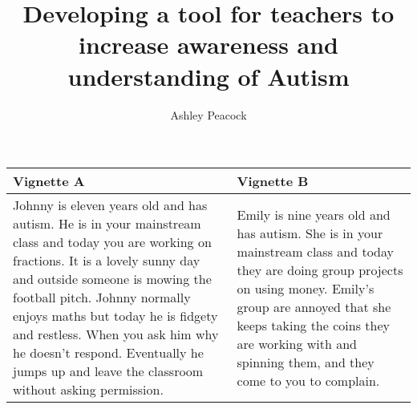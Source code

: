 \documentclass[11pt]{report}
\begin{document}
\title{Developing a tool for teachers to increase awareness and understanding of Autism}
\author{Ashley Peacock}
\maketitle
\begin{table}[H]
    \begin{tabular}{| p{6cm} | p{6cm} |}
    \hline
    \textbf{Vignette A} & \textbf{Vignette B} \\                                                                                                                                                                                     
    \hline
    \hline
    Johnny is eleven years old and has autism. He is in your mainstream class and today you are working on fractions. It is a lovely sunny day and outside someone is mowing the football pitch.  Johnny normally enjoys maths but today he is fidgety and restless.  When you ask him why he doesn't respond.  Eventually he jumps up and leave the classroom without asking permission. & Emily is nine years old and has autism. She is in your mainstream class and today they are doing group projects on using money. Emily's group are annoyed that she keeps taking the coins they are working with and spinning them, and they come to you to complain. \\ 
    \hline
    \end{tabular}
\end{table}
\end{document}
